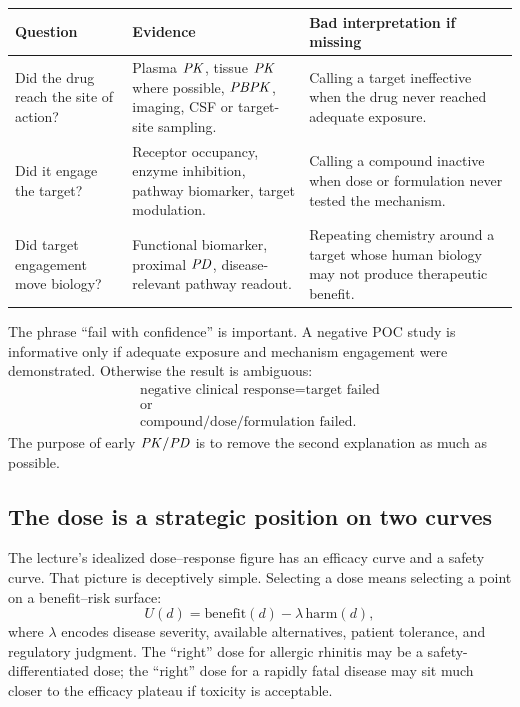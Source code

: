 \documentclass[a4paper]{article}
\newcommand{\PBPK}{\ensuremath{\pksym{PBPK}}}
\newcommand{\PK}{\ensuremath{\pksym{PK}}}
\newcommand{\PD}{\ensuremath{\pksym{PD}}}
\newcommand{\PKPD}{\ensuremath{\pksym{PK}/\pksym{PD}}}
\begin{document}
\begin{center}
\footnotesize
\begin{tabularx}{\textwidth}{p{}X X}
\toprule
Question & Evidence & Bad interpretation if missing \\
\midrule
Did the drug reach the site of action? &
Plasma \PK, tissue \PK{} where possible, \PBPK, imaging, CSF or target-site sampling. &
Calling a target ineffective when the drug never reached adequate exposure. \\
Did it engage the target? &
Receptor occupancy, enzyme inhibition, pathway biomarker, target modulation. &
Calling a compound inactive when dose or formulation never tested the mechanism. \\
Did target engagement move biology? &
Functional biomarker, proximal \PD, disease-relevant pathway readout. &
Repeating chemistry around a target whose human biology may not produce therapeutic benefit. \\
\bottomrule
\end{tabularx}
\end{center}

The phrase ``fail with confidence'' is important. A negative POC study is informative only if adequate exposure and mechanism engagement were demonstrated. Otherwise the result is ambiguous:
\[
  \begin{gathered}
    \text{negative clinical response}
    =
    \text{target failed}\\
    \text{or}\\
    \text{compound/dose/formulation failed}.
  \end{gathered}
\]
The purpose of early \PKPD{} is to remove the second explanation as much as possible.

\subsection{The dose is a strategic position on two curves}

The lecture's idealized dose--response figure has an efficacy curve and a safety curve. That picture is deceptively simple. Selecting a dose means selecting a point on a benefit--risk surface:
\[
  U(d)
  =
  \text{benefit}(d)
  -
  \lambda\,\text{harm}(d),
\]
where \(\lambda\) encodes disease severity, available alternatives, patient tolerance, and regulatory judgment. The ``right'' dose for allergic rhinitis may be a safety-differentiated dose; the ``right'' dose for a rapidly fatal disease may sit much closer to the efficacy plateau if toxicity is acceptable.
\end{document}
